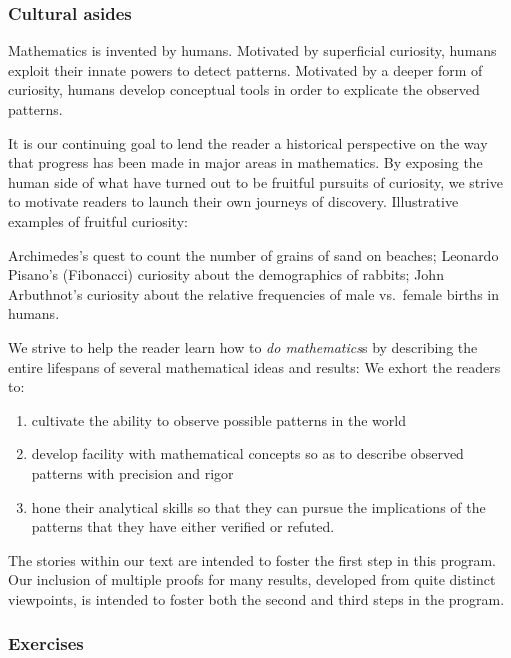 \subsubsection{Cultural asides}

Mathematics is invented by humans.  Motivated by superficial curiosity, humans exploit their innate powers to detect patterns.  Motivated by a deeper form of curiosity, humans develop conceptual tools in order to explicate the observed patterns.

\smallskip

It is our continuing goal to lend the reader a historical perspective on the way that progress has been made in major areas in mathematics.  By exposing the human side of what have turned out to be fruitful pursuits of curiosity, we strive to motivate readers to launch their own journeys of discovery.  Illustrative examples of fruitful curiosity:

Archimedes's quest to count the number of grains of sand on beaches; Leonardo Pisano's (Fibonacci) curiosity about the demographics of rabbits; John Arbuthnot's curiosity about the relative frequencies of male vs.~female births in humans. 

\smallskip

We strive to help the reader learn how to {\em do mathematics}s by describing the entire lifespans of several mathematical ideas and results:  We exhort the readers to:
\begin{enumerate}
\item
cultivate the ability to observe possible patterns in the world
\medskip\item
develop facility with mathematical concepts so as to describe observed patterns with precision and rigor
\medskip\item
hone their analytical skills so that they can pursue the implications of the patterns that they have either verified or refuted.
\end{enumerate}

\medskip

The stories within our text are intended to foster the first step in this program.  Our inclusion of  multiple proofs for many results, developed from quite distinct viewpoints, is intended to foster both the second and third steps in the program. 

\subsubsection{Exercises}

